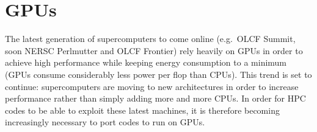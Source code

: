 \documentclass[a4paper]{jpconf}
\newcommand{\maestroex}{{\sffamily MAESTROeX}}
\newcommand{\amrex}{{\sffamily AMReX}}
\newcommand{\MarginPar}[1]{\marginpar{\vskip-\baselineskip\raggedright\tiny\sffamily\hrule\smallskip{\color{red}#1}\par\smallskip\hrule}}
\begin{document}

\section{GPUs} \label{sec:gpus}
 


The latest generation of supercomputers to come online (e.g.\ OLCF Summit, soon NERSC Perlmutter and OLCF Frontier) rely heavily on GPUs in order to achieve high performance while keeping energy consumption to a minimum (GPUs consume considerably less power per flop than CPUs). This trend is set to continue: supercomputers are moving to new architectures in order to increase performance rather than simply adding more and more CPUs. In order for HPC codes to be able to exploit these latest machines, it is therefore becoming increasingly necessary to port codes to run on GPUs.
\end{document}
